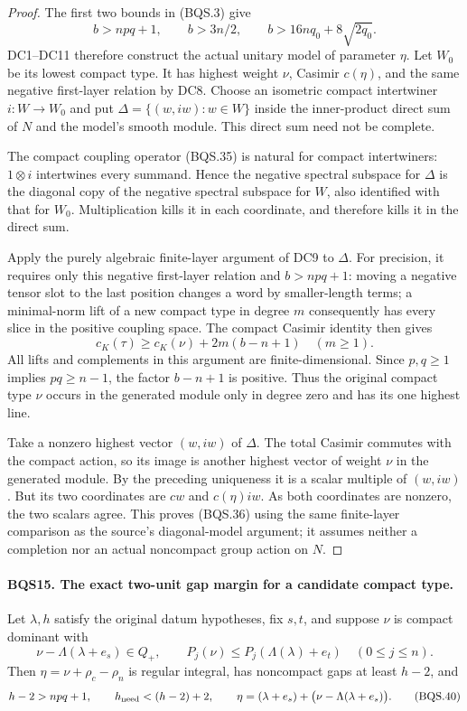 \documentclass[11pt,a4paper]{article}
\numberwithin{equation}{section}
\theoremstyle{remark}\newtheorem{remark}[theorem]{Remark}
\begin{document}
\begin{proof}
The first two bounds in (BQS.3) give
\[
 b>npq+1,\qquad b>3n/2,\qquad
 b>16nq_0+8\sqrt{2q_0}.
 \tag{BQS.37}
\]
DC1--DC11 therefore construct the actual unitary model of parameter
$\eta$.  Let $W_0$ be its lowest compact type.  It has highest weight
$\nu$, Casimir $c(\eta)$, and the same negative first-layer relation
by DC8.  Choose an isometric compact intertwiner $i:W\to W_0$ and
put $\Delta=\{(w,iw):w\in W\}$ inside the inner-product direct sum
of $N$ and the model's smooth module.
This direct sum need not be complete.

The compact coupling operator (BQS.35) is natural for compact
intertwiners: $1\otimes i$ intertwines every summand.  Hence the
negative spectral subspace for $\Delta$ is the diagonal copy of the
negative spectral subspace for $W$, also identified with that for
$W_0$.  Multiplication kills it in each coordinate, and therefore
kills it in the direct sum.

Apply the purely algebraic finite-layer argument of DC9 to $\Delta$.
For precision, it requires only this negative first-layer relation
and $b>npq+1$: moving a negative tensor slot to the last position
changes a word by smaller-length terms; a minimal-norm lift of a new
compact type in degree $m$ consequently has every slice in the positive
coupling space.  The compact Casimir identity then gives
\[
 c_K(\tau)\ge c_K(\nu)+2m(b-n+1)\quad(m\ge1).
 \tag{BQS.38}
\]
All lifts and complements in this argument are finite-dimensional.
Since $p,q\ge1$ implies $pq\ge n-1$, the factor $b-n+1$ is positive.
Thus the original compact type $\nu$ occurs in the generated module
only in degree zero and has its one highest line.

Take a nonzero highest vector $(w,iw)$ of $\Delta$.
The total Casimir commutes with the compact action, so its image is
another highest vector of weight $\nu$ in the generated module.
By the preceding uniqueness it is a scalar multiple of $(w,iw)$.
But its two coordinates are $cw$ and $c(\eta)iw$.
As both coordinates are nonzero, the two scalars agree.
This proves (BQS.36) using the same finite-layer comparison as the
source's diagonal-model argument; it assumes neither a completion nor
an actual noncompact group action on $N$.
\end{proof}

\paragraph{BQS15. The exact two-unit gap margin for a candidate compact type.}
\label{claim:BQS15}
Let $\lambda,h$ satisfy the original datum hypotheses, fix $s,t$, and
suppose $\nu$ is compact dominant with
\[
 \nu-\Lambda(\lambda+e_s)\in Q_+,\qquad
 P_j(\nu)\le P_j(\Lambda(\lambda)+e_t)\quad(0\le j\le n).
 \tag{BQS.39}
\]
Then $\eta=\nu+\rho_c-\rho_n$ is regular integral, has noncompact
gaps at least $h-2$, and
\[
 h-2>npq+1,\qquad h_{\rm need}< (h-2)+2,\qquad
 \eta=(\lambda+e_s)+
                 \bigl(\nu-\Lambda(\lambda+e_s)\bigr).
 \tag{BQS.40}
\]
\end{document}
